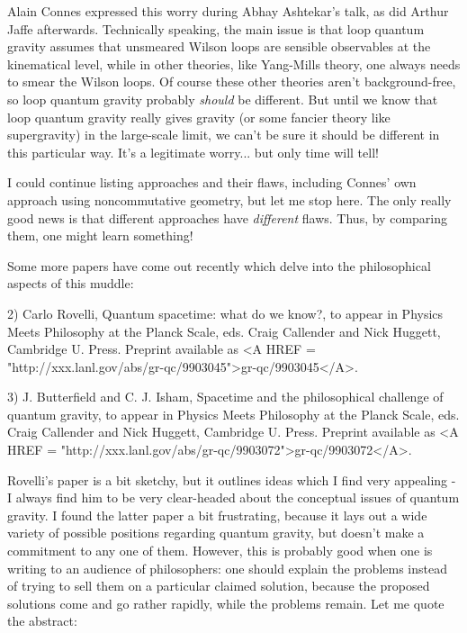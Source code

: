 Alain Connes expressed this worry during Abhay Ashtekar's talk, as did
Arthur Jaffe afterwards.  Technically speaking, the main issue is that
loop quantum gravity assumes that unsmeared Wilson loops are sensible
observables at the kinematical level, while in other theories, like
Yang-Mills theory, one always needs to smear the Wilson loops.  Of
course these other theories aren't background-free, so loop quantum
gravity probably \emph{should} be different.  But until we know that loop
quantum gravity really gives gravity (or some fancier theory like 
supergravity) in the large-scale limit, we can't be sure it should be
different in this particular way.  It's a legitimate worry... but only
time will tell!

I could continue listing approaches and their flaws, including Connes'
own approach using noncommutative geometry, but let me stop here.  The
only really good news is that different approaches have \emph{different}
flaws.  Thus, by comparing them, one might learn something!  

Some more papers have come out recently which delve into the 
philosophical aspects of this muddle: 


 2) Carlo Rovelli, Quantum spacetime: what do we know?, to appear in 
Physics Meets Philosophy at the Planck Scale, eds. Craig Callender and Nick
Huggett, Cambridge U. Press.  Preprint available as <A HREF =
"http://xxx.lanl.gov/abs/gr-qc/9903045">gr-qc/9903045</A>.

3) J. Butterfield and C. J. Isham, Spacetime and the philosophical 
challenge of quantum gravity, to appear in Physics Meets Philosophy 
at the Planck Scale, eds. Craig Callender and Nick Huggett, Cambridge 
U. Press.  Preprint available as 
<A HREF = "http://xxx.lanl.gov/abs/gr-qc/9903072">gr-qc/9903072</A>.

Rovelli's paper is a bit sketchy, but it outlines ideas which I find
very appealing - I always find him to be very clear-headed about the
conceptual issues of quantum gravity.  I found the latter paper a bit
frustrating, because it lays out a wide variety of possible positions
regarding quantum gravity, but doesn't make a commitment to any one of
them.  However, this is probably good when one is writing to an audience
of philosophers: one should explain the problems instead of trying to
sell them on a particular claimed solution, because the proposed
solutions come and go rather rapidly, while the problems remain.  Let me
quote the abstract:

